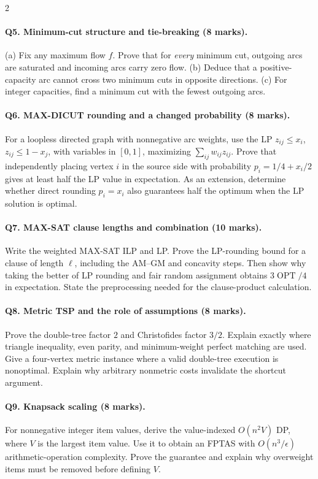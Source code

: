 \documentclass[10pt]{article}
\theoremstyle{definition}
\newcommand{\OPT}{\operatorname{OPT}}
\begin{document}
\begin{multicols*}{2}
\paragraph{Q5. Minimum-cut structure and tie-breaking (8 marks).}
(a) Fix any maximum flow $f$.  Prove that for \emph{every} minimum cut,
outgoing arcs are saturated and incoming arcs carry zero flow.
(b) Deduce that a positive-capacity arc cannot cross two minimum cuts in
opposite directions.  (c) For integer capacities, find a minimum cut with
the fewest outgoing arcs.

\paragraph{Q6. MAX-DICUT rounding and a changed probability (8 marks).}
For a loopless directed graph with nonnegative arc weights, use the LP
$z_{ij}\le x_i$, $z_{ij}\le1-x_j$, with variables in $[0,1]$, maximizing
$\sum_{ij}w_{ij}z_{ij}$.  Prove that independently placing vertex $i$ in
the source side with probability $p_i=1/4+x_i/2$ gives at least half the
LP value in expectation.  As an extension, determine whether direct
rounding $p_i=x_i$ also guarantees half the optimum when the LP solution
is optimal.

\paragraph{Q7. MAX-SAT clause lengths and combination (10 marks).}
Write the weighted MAX-SAT ILP and LP.  Prove the LP-rounding bound for a
clause of length $\ell$, including the AM--GM and concavity steps.  Then
show why taking the better of LP rounding and fair random assignment
obtains $3\OPT/4$ in expectation.  State the preprocessing needed for
the clause-product calculation.

\paragraph{Q8. Metric TSP and the role of assumptions (8 marks).}
Prove the double-tree factor $2$ and Christofides factor $3/2$.  Explain
exactly where triangle inequality, even parity, and minimum-weight perfect
matching are used.  Give a four-vertex metric instance where a valid
double-tree execution is nonoptimal.  Explain why arbitrary nonmetric
costs invalidate the shortcut argument.

\paragraph{Q9. Knapsack scaling (8 marks).}
For nonnegative integer item values, derive the value-indexed $O(n^2V)$ DP,
where $V$ is the largest item value.  Use it to obtain an FPTAS with
$O(n^3/\epsilon)$ arithmetic-operation complexity.  Prove the guarantee
and explain why overweight items must be removed before defining $V$.


\end{multicols*}
\end{document}
